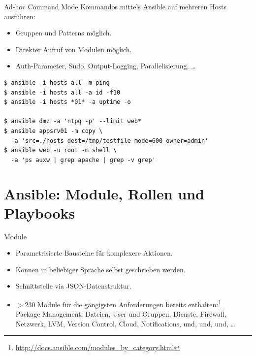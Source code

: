 \begin{frame}[fragile]{Ad-hoc Command Mode}
  Kommandos mittels Ansible auf mehreren Hosts ausführen:
  \begin{itemize}
    \item Gruppen und Patterns möglich.
    \item Direkter Aufruf von Modulen möglich.
    \item Auth-Parameter, Sudo, Output-Logging, Parallelisierung, \dots
  \end{itemize}
  \vspace{1ex}
  \begin{lstlisting}
$ ansible -i hosts all -m ping
$ ansible -i hosts all -a id -f10
$ ansible -i hosts *01* -a uptime -o

$ ansible dmz -a 'ntpq -p' --limit web*
$ ansible appsrv01 -m copy \
  -a 'src=./hosts dest=/tmp/testfile mode=600 owner=admin'
$ ansible web -u root -m shell \
  -a 'ps auxw | grep apache | grep -v grep'
  \end{lstlisting}
  
\end{frame}


\section{Ansible: Module, Rollen und Playbooks}

\begin{frame}{Module}
  \begin{itemize}
    \item Parametrisierte Bausteine für komplexere Aktionen.
    \item Können in beliebiger Sprache selbst geschrieben werden.
    \item Schnittstelle via JSON-Datenstruktur.
    \item $> 230$ Module für die gängigsten Anforderungen bereits
    enthalten:\footnote{\url{http://docs.ansible.com/modules_by_category.html}
    }\\[1ex]

    Package Management, Dateien, User und Gruppen, Dienste, Firewall,
    Netzwerk, LVM, Version Control, Cloud, Notifications, und, und, und,
    \dots
  \end{itemize}
\end{frame}


